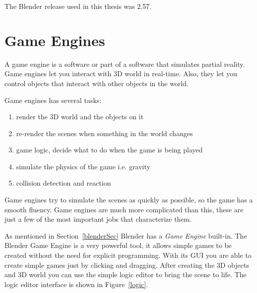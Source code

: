 The Blender release used in this thesis was 2.57.

\section{Game Engines}

A game engine is a software or part of a software that simulates partial reality\cite{bookGameKit2}. Game engines let you interact with 3D world in real-time. Also, they let you control objects that interact with other objects in the world. 

Game engines has several tasks:
\begin{enumerate}
\item{render the 3D world and the objects on it}
\item{re-render the scenes when something in the world changes}
\item{game logic, decide what to do when the game is being played}
\item{simulate the physics of the game i.e. gravity}
\item{collision detection and reaction}
\end{enumerate}

Game engines try to simulate the scenes as quickly as possible, so the game has a smooth fluency. Game engines are much more complicated than this, these are just a few of the most important jobs that characterize them.

As mentioned in Section~\ref{blenderSec} Blender has a \textit{Game Engine} built-in. The Blender Game Engine is a very powerful tool, it allows simple games to be created without  the need for explicit programming. With its GUI you are able to create simple games just by clicking and dragging. After creating the 3D objects and 3D world you can use the simple logic editor to bring the scene to life. The logic editor interface is shown in Figure~\ref{logic}.

